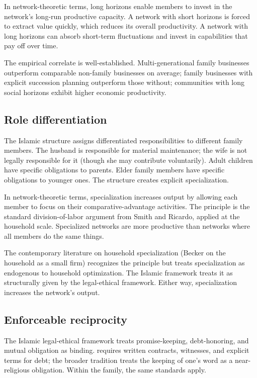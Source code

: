 In network-theoretic terms, long horizons enable members to
invest in the network's long-run productive capacity. A network
with short horizons is forced to extract value quickly, which
reduces its overall productivity. A network with long horizons can
absorb short-term fluctuations and invest in capabilities that pay
off over time.

The empirical correlate is well-established. Multi-generational
family businesses outperform comparable non-family businesses on
average; family businesses with explicit succession planning
outperform those without; communities with long social horizons
exhibit higher economic productivity.

\subsection{Role differentiation}

The Islamic  structure assigns differentiated
responsibilities to different family members. The husband is
responsible for material maintenance; the wife is not legally
responsible for it (though she may contribute voluntarily). Adult
children have specific obligations to parents. Elder family members
have specific obligations to younger ones. The structure creates
explicit specialization.

In network-theoretic terms, specialization increases output by
allowing each member to focus on their comparative-advantage
activities. The principle is the standard division-of-labor
argument from Smith and Ricardo, applied at the household scale.
Specialized networks are more productive than networks where all
members do the same things.

The contemporary literature on household specialization (Becker on
the household as a small firm) recognizes the principle but treats
specialization as endogenous to household optimization. The Islamic
framework treats it as structurally given by the legal-ethical
framework. Either way, specialization increases the network's
output.

\subsection{Enforceable reciprocity}

The Islamic legal-ethical framework treats promise-keeping, debt-honoring,
and mutual obligation as binding.  requires written
contracts, witnesses, and explicit terms for debt; the broader
tradition treats the keeping of one's word as a near-religious
obligation. Within the family, the same standards apply.

